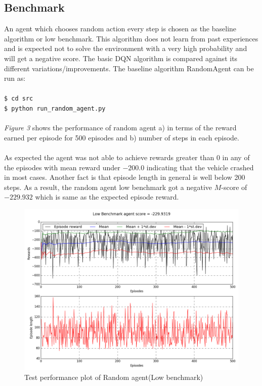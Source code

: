\documentclass{article}
\begin{document}
\subsection*{Benchmark}
An agent which chooses random action every step is chosen as the baseline algorithm or low benchmark. This algorithm does not learn from past experiences and is expected not to solve the environment with a very high probability and will get a negative score. The basic DQN algorithm is compared against its different variations/improvements.
The baseline algorithm RandomAgent can be run as:\\
\texttt{\\\$ cd src}
\texttt{\\\$ python run\_random\_agent.py}\\\\
\textit{Figure 3} shows the performance of random agent a) in terms of the reward earned per episode for 500 episodes and b) number of steps in each episode.\\\\
As expected the agent was not able to achieve rewards greater than $0$ in any of the episodes with mean reward under $-200.0$ indicating that the vehicle crashed in most cases. Another fact is that episode length in general is well below 200 steps. As a result, the random agent low benchmark got a negative $M$-score of $-229.932$ which is same as the expected episode reward.
\begin{figure}[H]
	\caption{Test performance plot of Random agent(Low benchmark)}
	\centering
	\includegraphics[width=13cm,trim={0 0 0 0},clip]{img/randomagent}
\end{figure}
\end{document}
